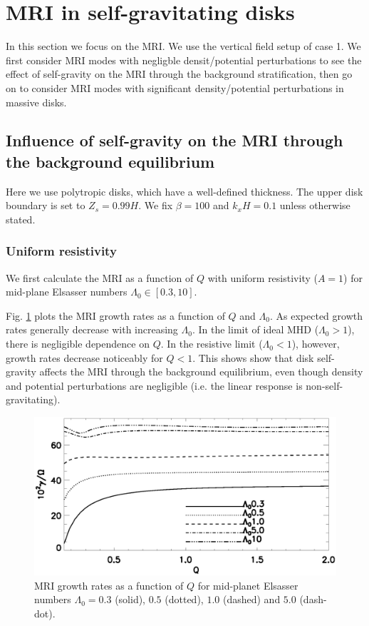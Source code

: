 \section{MRI in self-gravitating disks}\label{result1}
In this section we focus on the MRI. We use the vertical field setup
of case 1. We first consider MRI modes with negligble densit/potential
perturbations to see the effect of self-gravity on the MRI through the
background stratification, then go on to consider MRI modes with
significant density/potential perturbations in massive disks. 

\subsection{Influence of self-gravity on the MRI through the
  background equilibrium}

Here we use polytropic disks, which have a well-defined
thickness. The upper disk boundary is set to 
$Z_s=0.99H$. We fix $\beta=100$ and $k_xH=0.1$ unless otherwise
stated. 


\subsubsection{Uniform
  resistivity}  
We first calculate the MRI as a function of $Q$ with uniform
resistivity ($A=1$) for mid-plane Elsasser numbers $\Lambda_0\in[0.3,10]$.    

Fig. \ref{compare_growth_poly_uniresis} plots the MRI growth rates as
a function of $Q$ and $\Lambda_0$. As expected growth rates generally
decrease with increasing $\Lambda_0$. In the limit of ideal MHD ($\Lambda_0>1$), 
there is negligible dependence on $Q$. In the resistive limit
($\Lambda_0<1$), however, growth rates decrease noticeably for $Q<1$. This shows
show that disk self-gravity affects the MRI through the background
equilibrium, even though density and potential perturbations are  
negligible (i.e. the linear response is
non-self-gravitating).    
 
\begin{figure}
  \includegraphics[width=\linewidth]{figures/compare_growth_poly_uniresis2}
  \caption{MRI growth rates as a function of $Q$ for mid-planet
    Elsasser numbers $\Lambda_0=0.3$ (solid), $0.5$ (dotted), $1.0$
    (dashed) and $5.0$ (dash-dot).  
    \label{compare_growth_poly_uniresis}}
\end{figure}


